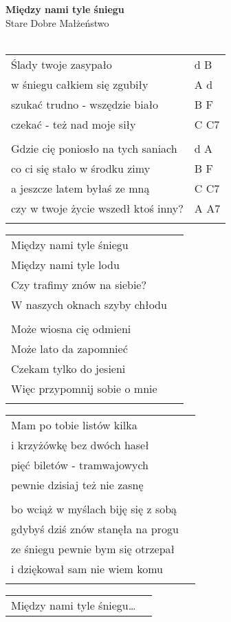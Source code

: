 \documentclass[a5paper]{article}
\begin{document}


\noindent
\fontsize{12pt}{15pt}\selectfont
\textbf{Między nami tyle śniegu} \\
\fontsize{8pt}{10pt}\selectfont
Stare Dobre Małżeństwo \\ \\
\fontsize{10pt}{12pt}\selectfont
{}
\begin{tabular}{@{}p{7.50cm}p{3cm}@{}}
\noindent
Ślady twoje zasypało & d B \\
w śniegu całkiem się zgubiły & A d \\
szukać trudno - wszędzie biało & B F \\
czekać - też nad moje siły & C C7 \\ \\

Gdzie cię poniosło na tych saniach & d A \\
co ci się stało w środku zimy & B F \\
a jeszcze latem byłaś ze mną & C C7 \\
czy w twoje życie wszedł ktoś inny? & A A7 \\ \\
\end{tabular}

\noindent
\begin{tabular}{@{}p{6.50cm}p{3cm}@{}}
	Między nami tyle śniegu \\
	Między nami tyle lodu \\
	Czy trafimy znów na siebie? \\
	W naszych oknach szyby chłodu \\ \\

	Może wiosna cię odmieni \\
	Może lato da zapomnieć \\
	Czekam tylko do jesieni \\
	Więc przypomnij sobie o mnie \\ \\
\end{tabular}

\noindent
\begin{tabular}{@{}p{6.50cm}p{3cm}@{}}
Mam po tobie listów kilka \\
i krzyżówkę bez dwóch haseł \\
pięć biletów - tramwajowych \\
pewnie dzisiaj też nie zasnę \\ \\

bo wciąż w myślach biję się z sobą \\  
gdybyś dziś znów stanęła na progu \\
ze śniegu pewnie bym się otrzepał \\
i dziękował sam nie wiem komu \\ \\
\end{tabular}

\noindent
\begin{tabular}{@{}p{6.50cm}p{3cm}@{}}
	Między nami tyle śniegu…
\end{tabular}
\end{document}
